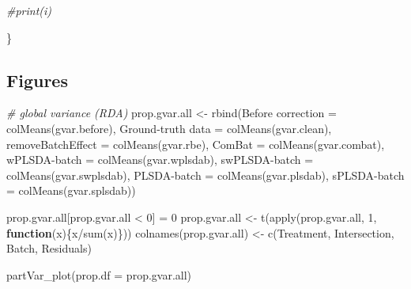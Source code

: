 \documentclass[
]{book}
\newenvironment{Shaded}{\begin{snugshade}}{\end{snugshade}}
\newcommand{\AttributeTok}[1]{\textcolor[rgb]{0.77,0.63,0.00}{#1}}
\newcommand{\CommentTok}[1]{\textcolor[rgb]{0.56,0.35,0.01}{\textit{#1}}}
\newcommand{\ControlFlowTok}[1]{\textcolor[rgb]{0.13,0.29,0.53}{\textbf{#1}}}
\newcommand{\DecValTok}[1]{\textcolor[rgb]{0.00,0.00,0.81}{#1}}
\newcommand{\FunctionTok}[1]{\textcolor[rgb]{0.00,0.00,0.00}{#1}}
\newcommand{\NormalTok}[1]{#1}
\newcommand{\OtherTok}[1]{\textcolor[rgb]{0.56,0.35,0.01}{#1}}
\newcommand{\SpecialCharTok}[1]{\textcolor[rgb]{0.00,0.00,0.00}{#1}}
\newcommand{\StringTok}[1]{\textcolor[rgb]{0.31,0.60,0.02}{#1}}
\begin{document}
\begin{Shaded}
\begin{Highlighting}[]
  \CommentTok{\#print(i)}
  
\NormalTok{\}}
\end{Highlighting}
\end{Shaded}

\hypertarget{figures-3}{%
\subsection{Figures}\label{figures-3}}

\begin{Shaded}
\begin{Highlighting}[]
\CommentTok{\# global variance (RDA)}
\NormalTok{prop.gvar.all }\OtherTok{\textless{}{-}} \FunctionTok{rbind}\NormalTok{(}\StringTok{\textasciigrave{}}\AttributeTok{Before correction}\StringTok{\textasciigrave{}} \OtherTok{=} \FunctionTok{colMeans}\NormalTok{(gvar.before),}
                       \StringTok{\textasciigrave{}}\AttributeTok{Ground{-}truth data}\StringTok{\textasciigrave{}} \OtherTok{=} \FunctionTok{colMeans}\NormalTok{(gvar.clean),}
                       \AttributeTok{removeBatchEffect =} \FunctionTok{colMeans}\NormalTok{(gvar.rbe),}
                       \AttributeTok{ComBat =} \FunctionTok{colMeans}\NormalTok{(gvar.combat),}
                       \StringTok{\textasciigrave{}}\AttributeTok{wPLSDA{-}batch}\StringTok{\textasciigrave{}} \OtherTok{=} \FunctionTok{colMeans}\NormalTok{(gvar.wplsdab),}
                       \StringTok{\textasciigrave{}}\AttributeTok{swPLSDA{-}batch}\StringTok{\textasciigrave{}} \OtherTok{=} \FunctionTok{colMeans}\NormalTok{(gvar.swplsdab),}
                       \StringTok{\textasciigrave{}}\AttributeTok{PLSDA{-}batch}\StringTok{\textasciigrave{}} \OtherTok{=} \FunctionTok{colMeans}\NormalTok{(gvar.plsdab),}
                       \StringTok{\textasciigrave{}}\AttributeTok{sPLSDA{-}batch}\StringTok{\textasciigrave{}} \OtherTok{=} \FunctionTok{colMeans}\NormalTok{(gvar.splsdab))}

\NormalTok{prop.gvar.all[prop.gvar.all }\SpecialCharTok{\textless{}} \DecValTok{0}\NormalTok{] }\OtherTok{=} \DecValTok{0}
\NormalTok{prop.gvar.all }\OtherTok{\textless{}{-}} \FunctionTok{t}\NormalTok{(}\FunctionTok{apply}\NormalTok{(prop.gvar.all, }\DecValTok{1}\NormalTok{, }\ControlFlowTok{function}\NormalTok{(x)\{x}\SpecialCharTok{/}\FunctionTok{sum}\NormalTok{(x)\}))}
\FunctionTok{colnames}\NormalTok{(prop.gvar.all) }\OtherTok{\textless{}{-}} \FunctionTok{c}\NormalTok{(}\StringTok{\textquotesingle{}Treatment\textquotesingle{}}\NormalTok{, }\StringTok{\textquotesingle{}Intersection\textquotesingle{}}\NormalTok{, }\StringTok{\textquotesingle{}Batch\textquotesingle{}}\NormalTok{, }\StringTok{\textquotesingle{}Residuals\textquotesingle{}}\NormalTok{)}

\FunctionTok{partVar\_plot}\NormalTok{(}\AttributeTok{prop.df =}\NormalTok{ prop.gvar.all)}
\end{Highlighting}
\end{Shaded}
\end{document}
